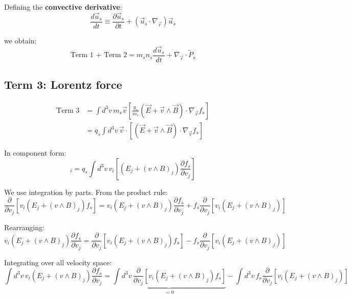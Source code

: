 Defining the \textbf{convective derivative}:
\begin{equation*}
\frac{d\vec{u}_s}{dt} \equiv \frac{\partial \vec{u}_s}{\partial t} + (\vec{u}_s \cdot \nabla_{\vec{r}}) \vec{u}_s
\end{equation*}

we obtain:
\begin{equation*}
\boxed{\text{Term 1 + Term 2} = m_s n_s \frac{d\vec{u}_s}{dt} + \nabla_{\vec{r}} \cdot \overleftrightarrow{P}_s}
\end{equation*}

\subsection{Term 3: Lorentz force}

\begin{align*}
\text{Term 3} &= \int d^3v \, m_s \vec{v} \left[ \frac{q_s}{m_s}(\vec{E} + \vec{v} \wedge \vec{B}) \cdot \nabla_{\vec{v}} f_s \right]  \\
&= q_s \int d^3v \, \vec{v} \cdot [(\vec{E} + \vec{v} \wedge \vec{B}) \cdot \nabla_{\vec{v}} f_s]
\end{align*}

In component form:
\begin{equation*}
[\text{Term 3}]_i = q_s \int d^3v \, v_i [(E_j + (v \wedge B)_j) \frac{\partial f_s}{\partial v_j}]
\end{equation*}

We use integration by parts. From the product rule:
\begin{equation*}
\frac{\partial}{\partial v_j} [v_i (E_j + (v \wedge B)_j) f_s] = v_i (E_j + (v \wedge B)_j) \frac{\partial f_s}{\partial v_j} + f_s \frac{\partial}{\partial v_j}[v_i (E_j + (v \wedge B)_j)]
\end{equation*}

Rearranging:
\begin{equation*}
v_i (E_j + (v \wedge B)_j) \frac{\partial f_s}{\partial v_j} = \frac{\partial}{\partial v_j} [v_i (E_j + (v \wedge B)_j) f_s] - f_s \frac{\partial}{\partial v_j}[v_i (E_j + (v \wedge B)_j)]
\end{equation*}

Integrating over all velocity space:
\begin{equation*}
\int d^3v \, v_i (E_j + (v \wedge B)_j) \frac{\partial f_s}{\partial v_j} = \underbrace{\int d^3v \, \frac{\partial}{\partial v_j} [v_i (E_j + (v \wedge B)_j) f_s]}_{=0} - \int d^3v \, f_s \frac{\partial}{\partial v_j}[v_i (E_j + (v \wedge B)_j)]
\end{equation*}

